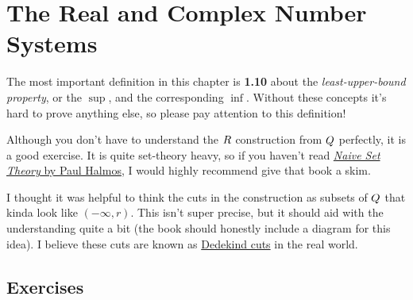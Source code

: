 \chapter{The Real and Complex Number Systems}

The most important definition in this chapter is \textbf{1.10} about the \textit{least-upper-bound property}, or the $\sup$, and the corresponding $\inf$. Without these concepts it's hard to prove anything else, so please pay attention to this definition!

Although you don't have to understand the $R$ construction from $Q$ perfectly, it is a good exercise. It is quite set-theory heavy, so if you haven't read \href{https://amzn.to/3MNZ8e7}{\textit{Naive Set Theory} by Paul Halmos}, I would highly recommend give that book a skim.

I thought it was helpful to think the cuts in the construction as subsets of $Q$ that kinda look like $(-\infty, r)$. This isn't super precise, but it should aid with the understanding quite a bit (the book should honestly include a diagram for this idea).
I believe these cuts are known as \href{https://en.wikipedia.org/wiki/Dedekind_cut}{Dedekind cuts} in the real world.

\section*{Exercises}



